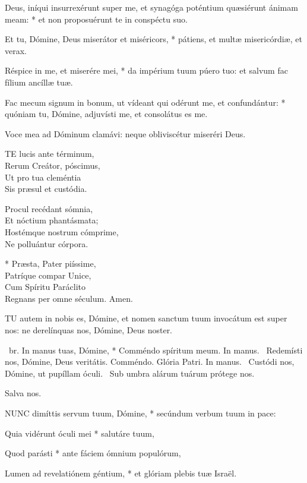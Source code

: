 Deus, iníqui insurrexérunt super me, et synagóga poténtium quæsiérunt ánimam meam: * et non proposuérunt te in conspéctu suo.

Et tu, Dómine, Deus miserátor et miséricors, * pátiens, et multæ misericórdiæ, et verax.

Réspice in me, et miserére mei, * da impérium tuum púero tuo: et salvum fac fílium ancíllæ tuæ.

Fac mecum signum in bonum, ut vídeant qui odérunt me, et confundántur: * quóniam tu, Dómine, adjuvísti me, et consolátus es me.

 Voce mea ad Dóminum clamávi: neque obliviscétur miseréri Deus.


\lettrine[lines=2]{T}{E} lucis ante términum,\\
Rerum Creátor, póscimus,\\
Ut pro tua cleméntia\\
Sis præsul et custódia.

Procul recédant sómnia,\\
Et nóctium phantásmata;\\
Hostémque nostrum cómprime,\\
Ne polluántur córpora.

* Præsta, Pater piíssime,\\
Patríque compar Unice,\\
Cum Spíritu Paráclito\\
Regnans per omne séculum. Amen.


\lettrine[lines=2]{T}{U} autem in nobis es, Dómine, et nomen sanctum tuum invocátum est super nos: ne derelínquas nos, Dómine, Deus noster.

\R\ br. In manus tuas, Dómine, * Comméndo spíritum meum. In manus. \V\ Redemísti nos, Dómine, Deus veritátis. Comméndo. Glória Patri. In manus. \V\ Custódi nos, Dómine, ut pupíllam óculi. \R\ Sub umbra alárum tuárum prótege nos.

 Salva nos.


\lettrine[lines=2]{N}{UNC} dimíttis servum tuum, Dómine, * secúndum verbum tuum in pace:

Quia vidérunt óculi mei * salutáre tuum,

Quod parásti * ante fáciem ómnium populórum,

Lumen ad revelatiónem géntium, * et glóriam plebis tuæ Israël.

